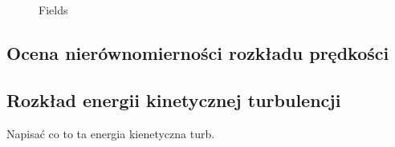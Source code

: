 \documentclass[peerreview]{IEEEtran}
\begin{document}
\begin{figure}
  \hfill
  \caption{Fields}
  \label{abc}
\end{figure}



\subsection{Ocena nierównomierności rozkładu prędkości}





\subsection{Rozkład energii kinetycznej turbulencji}
Napisać co to ta energia kienetyczna turb.
\end{document}
